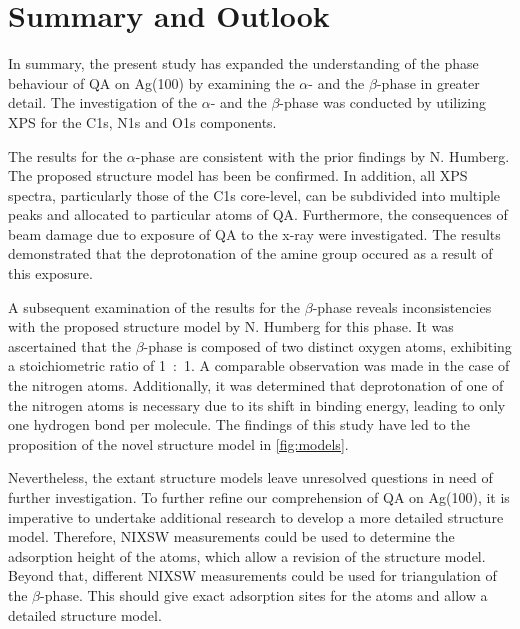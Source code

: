 \chapter{Summary and Outlook}

In summary, the present study has expanded the understanding of the phase behaviour of \ac{QA} on Ag(100) by examining the $\alpha$- and the $\beta$-phase in greater detail. The investigation of the $\alpha$- and the $\beta$-phase was conducted by utilizing \ac{XPS} for the C1s, N1s and O1s components.

The results for the $\alpha$-phase are consistent with the prior findings by N. Humberg.\autocite{Humberg2024} The proposed structure model has been be confirmed. In addition, all \ac{XPS} spectra, particularly those of the C1s core-level, can be subdivided into multiple peaks and allocated to particular atoms of \ac{QA}. Furthermore, the consequences of beam damage due to exposure of \ac{QA} to the x-ray were investigated. The results demonstrated that the deprotonation of the amine group occured as a result of this exposure.

A subsequent examination of the results for the $\beta$-phase reveals inconsistencies with the proposed structure model by N. Humberg\autocite{Humberg2024} for this phase. It was ascertained that the $\beta$-phase is composed of two distinct oxygen atoms, exhibiting a stoichiometric ratio of 1~:~1. A comparable observation was made in the case of the nitrogen atoms. Additionally, it was determined that deprotonation of one of the nitrogen atoms is necessary due to its shift in binding energy, leading to only one hydrogen bond per molecule. The findings of this study have led to the proposition of the novel structure model in \autoref{fig:models}.

Nevertheless, the extant structure models leave unresolved questions in need of further investigation. To further refine our comprehension of \ac{QA} on Ag(100), it is imperative to undertake additional research to develop a more detailed structure model. Therefore, \ac{NIXSW} measurements could be used to determine the adsorption height of the atoms, which allow a revision of the structure model. Beyond that, different \ac{NIXSW} measurements could be used for triangulation of the $\beta$-phase. This should give exact adsorption sites for the atoms and allow a detailed structure model.

\cleardoublepage